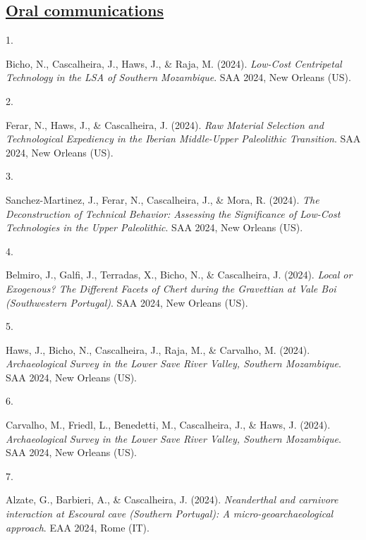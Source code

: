 \documentclass[11pt,a4paper,]{awesome-cv}
\newlength{\cslhangindent}
\newlength{\csllabelwidth}
\newenvironment{CSLReferences}[2] %
 {\begin{list}{}{%
  \setlength{\itemindent}{0pt}
  \setlength{\leftmargin}{0pt}
  \setlength{\parsep}{0pt}
  \ifodd #1
   \setlength{\leftmargin}{\cslhangindent}
   \setlength{\itemindent}{-1\cslhangindent}
  \fi
  \setlength{\itemsep}{#2\baselineskip}}}
 {\end{list}}
\newcommand{\CSLLeftMargin}[1]{\parbox[t]{\csllabelwidth}{\strut#1\strut}}
\newcommand{\CSLRightInline}[1]{\parbox[t]{\linewidth - \csllabelwidth}{\strut#1\strut}}
\begin{document}
\subsection{\texorpdfstring{\ul{Oral
communications}}{Oral communications}}\label{oral-communications}

\label{refs-8be73e082360a9f08535bc18ef768fac}
\begin{CSLReferences}{0}{0}
\CSLLeftMargin{1. }%
\CSLRightInline{Bicho, N., Cascalheira, J., Haws, J., \& Raja, M.
(2024). \emph{Low-Cost Centripetal Technology in the LSA of Southern
Mozambique}. SAA 2024, New Orleans (US).}

\CSLLeftMargin{2. }%
\CSLRightInline{Ferar, N., Haws, J., \& Cascalheira, J. (2024).
\emph{Raw Material Selection and Technological Expediency in the Iberian
Middle-Upper Paleolithic Transition}. SAA 2024, New Orleans (US).}

\CSLLeftMargin{3. }%
\CSLRightInline{Sanchez-Martinez, J., Ferar, N., Cascalheira, J., \&
Mora, R. (2024). \emph{The Deconstruction of Technical Behavior:
Assessing the Significance of Low-Cost Technologies in the Upper
Paleolithic}. SAA 2024, New Orleans (US).}

\CSLLeftMargin{4. }%
\CSLRightInline{Belmiro, J., Galfi, J., Terradas, X., Bicho, N., \&
Cascalheira, J. (2024). \emph{Local or Exogenous? The Different Facets
of Chert during the Gravettian at Vale Boi (Southwestern Portugal)}. SAA
2024, New Orleans (US).}

\CSLLeftMargin{5. }%
\CSLRightInline{Haws, J., Bicho, N., Cascalheira, J., Raja, M., \&
Carvalho, M. (2024). \emph{Archaeological Survey in the Lower Save River
Valley, Southern Mozambique}. SAA 2024, New Orleans (US).}

\CSLLeftMargin{6. }%
\CSLRightInline{Carvalho, M., Friedl, L., Benedetti, M., Cascalheira,
J., \& Haws, J. (2024). \emph{Archaeological Survey in the Lower Save
River Valley, Southern Mozambique}. SAA 2024, New Orleans (US).}

\CSLLeftMargin{7. }%
\CSLRightInline{Alzate, G., Barbieri, A., \& Cascalheira, J. (2024).
\emph{Neanderthal and carnivore interaction at Escoural cave (Southern
Portugal): A micro-geoarchaeological approach}. EAA 2024, Rome (IT).}


\end{CSLReferences}
\end{document}
